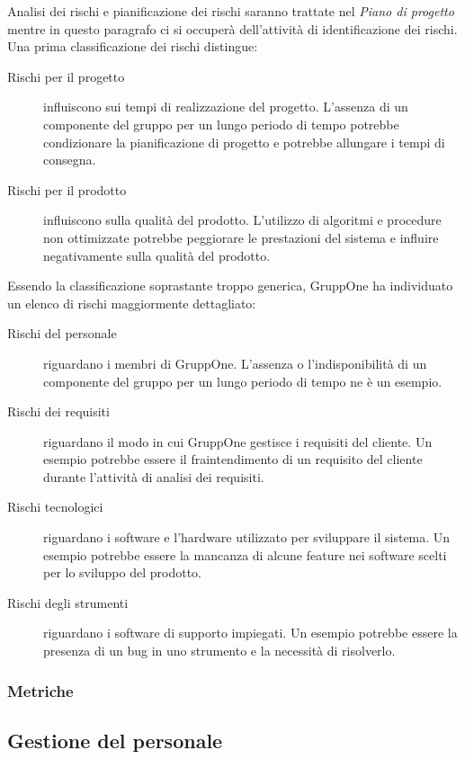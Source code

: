 \documentclass[../norme-di-progetto.tex]{subfiles}
\begin{document}
Analisi dei rischi e pianificazione dei rischi saranno trattate nel \textit{Piano di progetto} mentre in questo paragrafo ci si occuperà dell'attività di identificazione dei rischi.
Una prima classificazione dei rischi distingue:

\begin{description}
  \item [Rischi per il progetto] influiscono sui tempi di realizzazione del progetto. L'assenza di un componente del gruppo per un lungo periodo di tempo potrebbe condizionare la pianificazione di progetto e potrebbe allungare i tempi di consegna.
  \item [Rischi per il prodotto] influiscono sulla qualità del prodotto. L'utilizzo di algoritmi e procedure non ottimizzate potrebbe peggiorare le prestazioni del sistema e influire negativamente sulla qualità del prodotto.
\end{description}
Essendo la classificazione soprastante troppo generica, GruppOne ha individuato un elenco di rischi maggiormente dettagliato:
\begin{description}
  \item [Rischi del personale] riguardano i membri di GruppOne. L'assenza o l'indisponibilità di un componente del gruppo per un lungo periodo di tempo ne è un esempio.
  \item [Rischi dei requisiti] riguardano il modo in cui GruppOne gestisce i requisiti del cliente. Un esempio potrebbe essere il fraintendimento di un requisito del cliente durante l'attività di analisi dei requisiti.
  \item [Rischi tecnologici] riguardano i software e l'hardware utilizzato per sviluppare il sistema. Un esempio potrebbe essere la mancanza di alcune feature nei software scelti per lo sviluppo del prodotto.
  \item [Rischi degli strumenti] riguardano i software di supporto impiegati. Un esempio potrebbe essere la presenza di un bug in uno strumento e la necessità di risolverlo.
\end{description}

\subsubsection{Metriche}%
\label{subs:gestione_dei_rischi/metriche}


\subsection{Gestione del personale}%
\label{sub:gestione_del_personale}
\end{document}
